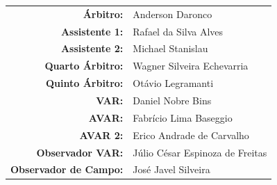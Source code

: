 \documentclass[11pt]{article}
\newcommand{\teamjersey}{}
\begin{document}
\vspace{0.5cm}
\begin{minipage}{0.65\textwidth}
\begin{center}
\begin{tabular}{rl}
\textbf{Árbitro:} & Anderson Daronco \\
\textbf{Assistente 1:} & Rafael da Silva Alves \\
\textbf{Assistente 2:} & Michael Stanislau \\
\textbf{Quarto Árbitro:} & Wagner Silveira Echevarria \\
\textbf{Quinto Árbitro:} & Otávio Legramanti \\
\textbf{VAR:} & Daniel Nobre Bins \\
\textbf{AVAR:} & Fabrício Lima Baseggio \\
\textbf{AVAR 2:} & Erico Andrade de Carvalho \\
\textbf{Observador VAR:} & Júlio César Espinoza de Freitas \\
\textbf{Observador de Campo:} & José Javel Silveira \\
\end{tabular}
\end{center}
\end{minipage}
\begin{minipage}{0.3\textwidth}
\end{minipage}
\newpage
\vspace{0.5cm}
\renewcommand{\teamjersey}{../assets/camisa/costas1.png}
\end{document}
